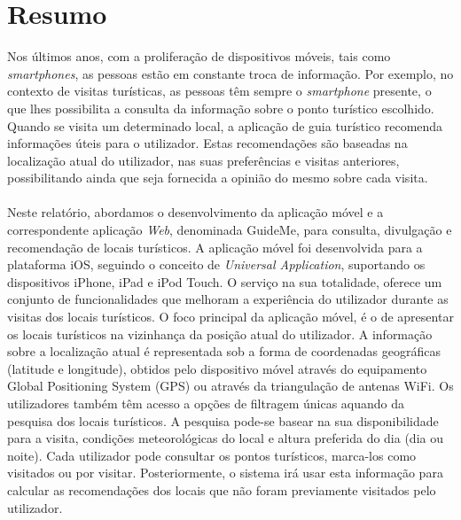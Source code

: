 \chapter*{Resumo}
Nos últimos anos, com a proliferação de dispositivos móveis, tais como \textit{smartphones}, as pessoas estão em constante troca de informação. Por exemplo, no contexto de visitas turísticas, as pessoas têm sempre o \textit{smartphone} presente, o que lhes possibilita a consulta da informação sobre o ponto turístico escolhido. Quando se visita um determinado local, a aplicação de guia turístico recomenda informações úteis para o utilizador. Estas recomendações são baseadas na localização atual do utilizador, nas suas preferências e visitas anteriores, possibilitando ainda que seja fornecida a opinião do mesmo sobre cada visita.\\
\\
Neste relatório, abordamos o desenvolvimento da aplicação móvel e a correspondente aplicação \textit{Web}, denominada GuideMe, para consulta, divulgação e recomendação de locais turísticos. A aplicação móvel foi desenvolvida para a plataforma iOS, seguindo o conceito de \textit{Universal Application}, suportando os dispositivos iPhone, iPad e iPod Touch. O serviço na sua totalidade, oferece um conjunto de funcionalidades que melhoram a experiência do utilizador durante as visitas dos locais turísticos. O foco principal da aplicação móvel, é o de apresentar os locais turísticos na vizinhança da posição atual do utilizador. A informação sobre a localização atual é representada sob a forma de coordenadas geográficas (latitude e longitude), obtidos pelo dispositivo móvel através do equipamento Global Positioning System (GPS) ou através da triangulação de antenas WiFi. Os utilizadores também têm acesso a opções de filtragem únicas aquando da pesquisa dos locais turísticos. A pesquisa pode-se basear na sua disponibilidade para a visita, condições meteorológicas do local e altura preferida do dia (dia ou noite). Cada utilizador pode consultar os pontos turísticos, marca-los como visitados ou por visitar. Posteriormente, o sistema irá usar esta informação para calcular as recomendações dos locais que não foram previamente visitados pelo utilizador.\\
\\
